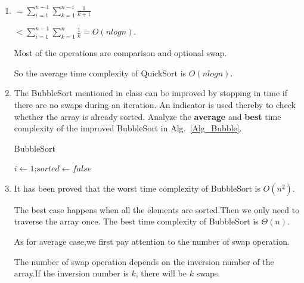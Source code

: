 \documentclass[12pt,a4paper]{article}
\makeatletter
\newtheorem*{solution}{Solution}
\theoremstyle{definition}
\renewenvironment{solution}[1][Solution] {\par\pushQED{\qed}\normalfont\topsep6\p@\@plus6\p@\relax\trivlist\item[\hskip\labelsep\bfseries#1\@addpunct{.}]\ignorespaces}{\popQED\endtrivlist\@endpefalse} \makeatother
\makeatother
\begin{document}
\begin{enumerate}
\begin{solution}
        \quad$=\sum_{i=1}^{n-1}\sum_{k=1}^{n-i}\frac{1}{k+1}$
        
        \quad$<\sum_{i=1}^{n-1}\sum_{k=1}^{n}\frac{1}{k}=O(nlogn)$.
        
        Most of the operations are comparison and optional swap.
        
        So the average time complexity of QuickSort is $O(nlogn)$.
        
    \end{solution}

    \item
    The BubbleSort mentioned in class can be improved by stopping in time if there are no swaps during an iteration. An indicator is used thereby to check whether the array is already sorted. Analyze the \textbf{average} and \textbf{best} time complexity of the improved BubbleSort in Alg.~\ref{Alg_Bubble}.

    \begin{minipage}[t]{0.8\textwidth}
    \begin{algorithm}[H]

        \BlankLine
        \caption{BubbleSort}\label{Alg_Bubble}

        $i\leftarrow 1$;$sorted\leftarrow false$\;

    \end{algorithm}
    \end{minipage}

    \begin{solution}
        It has been proved that the worst time complexity of BubbleSort is $O(n^2)$.
        
        The best case happens when all the elements are sorted.Then we only need to traverse the array once.
        The best time complexity of BubbleSort is $\Theta(n)$.
    
        As for average case,we first pay attention to the number of swap operation.
        
        The number of swap operation depends on the inversion number of the array.If the inversion number is $k$, there will be $k$ swaps.
        

\end{solution}
\end{enumerate}
\end{document}
